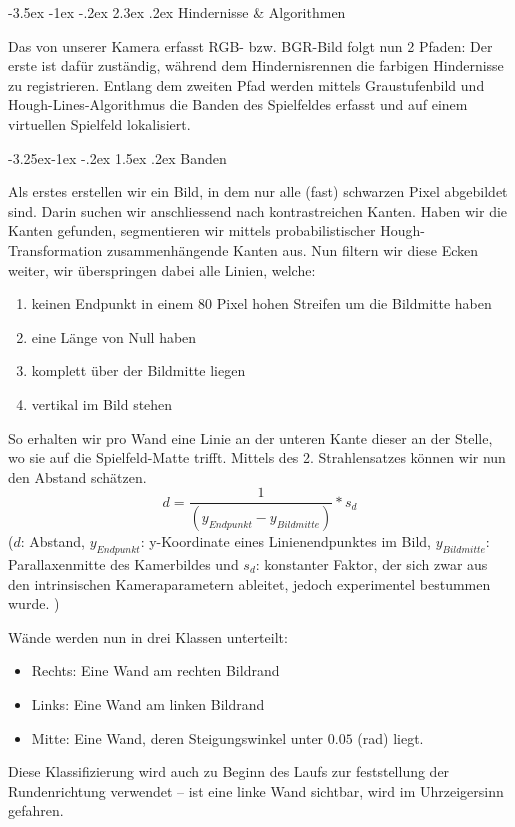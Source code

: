 \documentclass[a4paper]{scrarticle}
\makeatletter
\renewcommand\section{\@startsection {section}{1}{\z@}%
                                   {-3.5ex \@plus -1ex \@minus -.2ex}%
                                   {2.3ex \@plus.2ex}%
                                   {\Huge\AKAfont}}
\renewcommand\subsection{\@startsection{subsection}{2}{\z@}%
                                     {-3.25ex\@plus -1ex \@minus -.2ex}%
                                     {1.5ex \@plus .2ex}%
                                     {\Large\AKAfont}}
\makeatother
\begin{document}
\section{Hindernisse \& Algorithmen}

Das von unserer Kamera erfasst RGB- bzw. BGR-Bild folgt nun 2 Pfaden: Der erste ist dafür zuständig, während dem Hindernisrennen die farbigen Hindernisse zu registrieren. Entlang dem zweiten Pfad werden mittels Graustufenbild und Hough-Lines-Algorithmus die Banden des Spielfeldes erfasst und auf einem virtuellen Spielfeld lokalisiert.

\subsection{Banden}

Als erstes erstellen wir ein Bild, in dem nur alle (fast) schwarzen Pixel abgebildet sind. Darin suchen wir anschliessend nach kontrastreichen Kanten.
Haben wir die Kanten gefunden, segmentieren wir mittels probabilistischer Hough-Transformation zusammenhängende Kanten aus.
Nun filtern wir diese Ecken weiter, wir überspringen dabei alle Linien, welche:
\begin{enumerate}
	\item {keinen Endpunkt in einem 80 Pixel hohen Streifen um die Bildmitte haben}
	\item {eine Länge von Null haben}
	\item {komplett über der Bildmitte liegen}
	\item {vertikal im Bild stehen}
\end{enumerate}
So erhalten wir pro Wand eine Linie an der unteren Kante dieser an der Stelle, wo sie auf die Spielfeld-Matte trifft.
Mittels des 2. Strahlensatzes können wir nun den Abstand schätzen.
$$
d = \frac{1}{(y_{Endpunkt}-y_{Bildmitte})} * s_d
$$
($d$: Abstand, $y_{Endpunkt}$: y-Koordinate eines Linienendpunktes im Bild, $y_{Bildmitte}$: Parallaxenmitte des Kamerbildes und $s_d$: konstanter Faktor, der sich zwar aus den intrinsischen Kameraparametern ableitet, jedoch experimentel bestummen wurde. )

Wände werden nun in drei Klassen unterteilt:
\begin{itemize}
	\item Rechts: Eine Wand am rechten Bildrand
	\item Links: Eine Wand am linken Bildrand
	\item Mitte: Eine Wand, deren Steigungswinkel unter $0.05$ (rad) liegt.
\end{itemize}
Diese Klassifizierung wird auch zu Beginn des Laufs zur feststellung der Rundenrichtung verwendet – ist eine linke Wand sichtbar, wird im Uhrzeigersinn gefahren.
\end{document}
